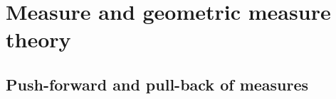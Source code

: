 \documentclass[12pt]{amsbook}%
\newtheorem{cor}[thm]{Corollary}
\theoremstyle{definition}
\theoremstyle{remark}
\numberwithin{section}{chapter}
\numberwithin{subsection}{section}
\numberwithin{figure}{chapter}
\DeclareMathOperator{\Th}{Th}
\newcommand\bac[1]{{\color{blue} #1} }
\def\cF{{\mathscr{F}}}
\begin{document}
{{%
%
%
%
%

%

\chapter[Appendix D]{%
Measure and geometric measure theory}
\label{sec:appendix D}





\section{Push-forward and pull-back of measures}\label{sec:measures}

}}
\end{document}
